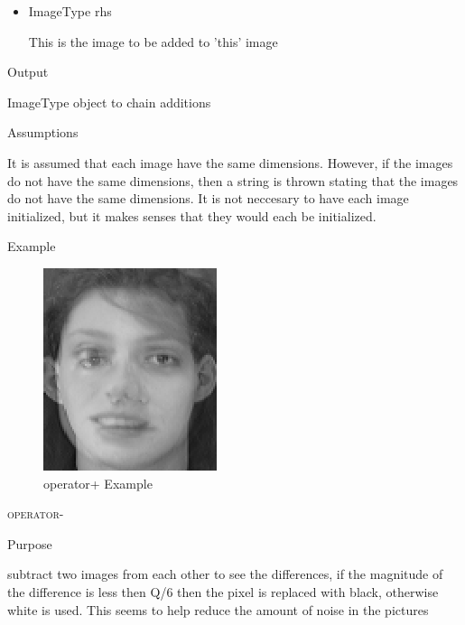\documentclass[pdftex, 11pt]{article}
\begin{document}
\begin{description}
\begin{description}
				\begin{itemize}
						
					\item{ImageType rhs}

						This is the image to be added to
						'this' image

				\end{itemize}

			\item{Output}

				ImageType object to chain additions

			\item{Assumptions}

				It is assumed that each image have the same dimensions.
				However, if the images do not have the same dimensions,
				then a string is thrown stating that the images do
				not have the same dimensions. It is not neccesary to have
				each image initialized, but it makes senses
				that they would each be initialized.

			\item{Example}

				\begin{figure}[h]
					\centering
					\caption{operator+ Example}
				\includegraphics{images/outasum.png}
			\end{figure}


		\end{description}


	\item{\textsc{operator-}}
		\begin{description}
			\item{Purpose}

				subtract two images from each other to see the 
				differences, if the magnitude of
				the difference is less then Q/6 then the pixel
				is replaced with black,	otherwise white is used. 
				This seems to help reduce 
				the amount of noise in the pictures


\end{description}
\end{description}
\end{document}
